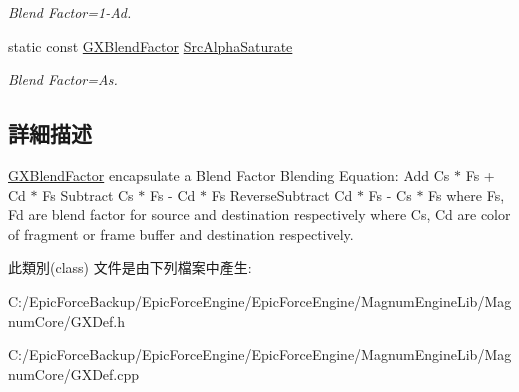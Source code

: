 \begin{DoxyCompactItemize}
\begin{DoxyCompactList}\small\item\em Blend Factor=1-\/\+Ad. \end{DoxyCompactList}\item 
static const \hyperlink{class_magnum_1_1_g_x_blend_factor}{G\+X\+Blend\+Factor} \hyperlink{class_magnum_1_1_g_x_blend_factor_a4527e91ff4267d77e7c96852f61423ba}{Src\+Alpha\+Saturate}\hypertarget{class_magnum_1_1_g_x_blend_factor_a4527e91ff4267d77e7c96852f61423ba}{}\label{class_magnum_1_1_g_x_blend_factor_a4527e91ff4267d77e7c96852f61423ba}

\begin{DoxyCompactList}\small\item\em Blend Factor=As. \end{DoxyCompactList}\end{DoxyCompactItemize}


\subsection{詳細描述}
\hyperlink{class_magnum_1_1_g_x_blend_factor}{G\+X\+Blend\+Factor} encapsulate a Blend Factor Blending Equation\+: Add Cs $\ast$ Fs + Cd $\ast$ Fs Subtract Cs $\ast$ Fs -\/ Cd $\ast$ Fs Reverse\+Subtract Cd $\ast$ Fs -\/ Cs $\ast$ Fs where Fs, Fd are blend factor for source and destination respectively where Cs, Cd are color of fragment or frame buffer and destination respectively. 

此類別(class) 文件是由下列檔案中產生\+:\begin{DoxyCompactItemize}
\item 
C\+:/\+Epic\+Force\+Backup/\+Epic\+Force\+Engine/\+Epic\+Force\+Engine/\+Magnum\+Engine\+Lib/\+Magnum\+Core/G\+X\+Def.\+h\item 
C\+:/\+Epic\+Force\+Backup/\+Epic\+Force\+Engine/\+Epic\+Force\+Engine/\+Magnum\+Engine\+Lib/\+Magnum\+Core/G\+X\+Def.\+cpp\end{DoxyCompactItemize}

